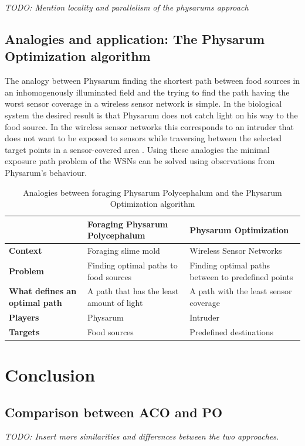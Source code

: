 \documentclass[cameraready]{IWORK2014}
\begin{document}
\textit{TODO: Mention locality and parallelism of the physarums approach}
\subsection{Analogies and application: The Physarum Optimization algorithm}
The analogy between Physarum finding the shortest path between food sources in an inhomogenously illuminated field and the trying to find the path having the worst sensor coverage in a wireless sensor network is simple. In the biological system the desired result is that Physarum does not catch light on his way to the food source. In the wireless sensor networks this corresponds to an intruder that does not want to be exposed to sensors while traversing between the selected target points in a sensor-covered area \cite{liu2012physarum}. Using these analogies the minimal exposure path problem of the WSNs can be solved using observations from Physarum's behaviour.

\begin{table}
	\begin{tabularx}{0.90\textwidth}{|X|X|X|}
		\hline & \textbf{Foraging Physarum Polycephalum} & \textbf{Physarum Optimization} \\ \hline
		\textbf{Context} & Foraging slime mold & Wireless Sensor Networks \\ \hline
		\textbf{Problem} & Finding optimal paths to food sources & Finding optimal paths between to predefined points \\ \hline
		\textbf{What defines an optimal path} & A path that has the least amount of light & A path with the least sensor coverage \\ \hline
		\textbf{Players} & Physarum & Intruder \\ \hline
		\textbf{Targets} & Food sources & Predefined destinations \\ \hline
	\end{tabularx}
	\caption{Analogies between foraging Physarum Polycephalum and the Physarum Optimization algorithm}
	\label{tbl:analogies_physarum}
\end{table}

\section{Conclusion}

\subsection{Comparison between ACO and PO}
\textit{TODO: Insert more similarities and differences between the two approaches.}
\end{document}
